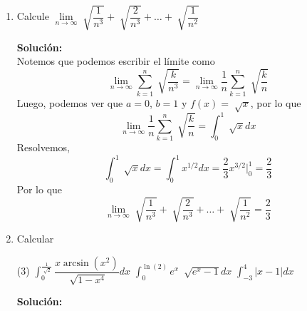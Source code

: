 \documentclass[12pt]{article}
\newenvironment{solucion}
{\begin{mdframed}[backgroundcolor=black!10]
		{\bf Solución:}\\
	}
	{
	\end{mdframed}
}
\newenvironment{preguntas}
{\begin{enumerate}\itemsep12pt
	}
	{
	\end{enumerate}
}
\newcommand{\ev}{\Big|}
\newcommand{\ra}{\rightarrow}
\begin{document}
\begin{preguntas}
\item Calcule $\lim\limits_{n \ra \infty} \sqrt[]{\dfrac{1}{n^3}} + \sqrt[]{\dfrac{2}{n^3}} + \dots  + \sqrt[]{\dfrac{1}{n^2}}$
\begin{solucion}
Notemos que podemos escribir el límite como
$$\lim\limits_{n \ra \infty} \sum\limits_{k=1}^{n}\sqrt[]{\dfrac{k}{n^3}} =
\lim\limits_{n \ra \infty} \dfrac{1}{n} \sum\limits_{k=1}^{n}\sqrt[]{\dfrac{k}{n}}$$
Luego, podemos ver que $a=0$, $b=1$ y $f(x) = \sqrt[]{x}$, por lo que
$$
\lim\limits_{n \ra \infty} \dfrac{1}{n} \sum\limits_{k=1}^{n}\sqrt[]{\dfrac{k}{n}} = \displaystyle\int_0^1\sqrt[]{x}dx$$
Resolvemos,
$$\displaystyle\int_0^1\sqrt[]{x}dx = 
\displaystyle\int_0^1 x^{1/2}dx =
\dfrac{2}{3}x^{3/2} \ev_0^1 =
\dfrac{2}{3}
$$
Por lo que
$$\lim\limits_{n \ra \infty} \sqrt[]{\dfrac{1}{n^3}} + \sqrt[]{\dfrac{2}{n^3}} + \dots  + \sqrt[]{\dfrac{1}{n^2}} = \dfrac{2}{3}$$
\end{solucion}
\item Calcular
\begin{tasks}(3)
\task $\displaystyle\int_0^{\frac{1}{\sqrt[]{2}}} \dfrac{x \arcsin(x^2)}{\sqrt[]{1-x^4}}dx$
\task $\displaystyle\int_0^{\ln(2)} e^x\ \sqrt[]{e^x-1}dx$
\task $\displaystyle\int_{-3}^{4} |x-1|dx$
\end{tasks}
\begin{solucion}


\end{solucion}
\end{preguntas}
\end{document}
